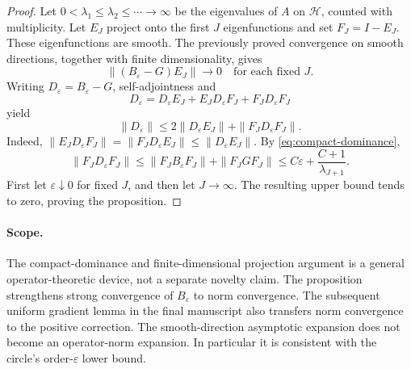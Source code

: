 \begin{proof}
Let $0<\lambda_1\le\lambda_2\le\cdots\to\infty$ be the
eigenvalues of $A$ on $\mathcal H$, counted with multiplicity.
Let $E_J$ project onto the first $J$ eigenfunctions and set
$F_J=I-E_J$.  These eigenfunctions are smooth.  The previously
proved convergence on smooth directions, together with finite
dimensionality, gives
\[
 \|(B_\varepsilon-G)E_J\|\longrightarrow0
 \quad\text{for each fixed }J.
\]
Writing $D_\varepsilon=B_\varepsilon-G$, self-adjointness and
\[
 D_\varepsilon
 =D_\varepsilon E_J+E_JD_\varepsilon F_J
   +F_JD_\varepsilon F_J
\]
yield
\[
 \|D_\varepsilon\|
 \le2\|D_\varepsilon E_J\|
      +\|F_JD_\varepsilon F_J\|.
\]
Indeed,
$\|E_JD_\varepsilon F_J\|
=\|F_JD_\varepsilon E_J\|\le\|D_\varepsilon E_J\|$.
By \eqref{eq:compact-dominance},
\[
 \|F_JD_\varepsilon F_J\|
 \le\|F_JB_\varepsilon F_J\|+\|F_JGF_J\|
 \le C\varepsilon+\frac{C+1}{\lambda_{J+1}}.
\]
First let $\varepsilon\downarrow0$ for fixed $J$, and then let
$J\to\infty$.  The resulting upper bound tends to zero, proving
the proposition.
\end{proof}

\paragraph{Scope.}
The compact-dominance and finite-dimensional projection argument is
a general operator-theoretic device, not a separate novelty claim.
The proposition strengthens strong convergence of $B_\varepsilon$
to norm convergence. The subsequent uniform gradient lemma in the final manuscript also transfers norm convergence to the positive correction. The smooth-direction asymptotic expansion does not become an operator-norm expansion.  In particular it is
consistent with the circle's order-$\varepsilon$ lower bound.
